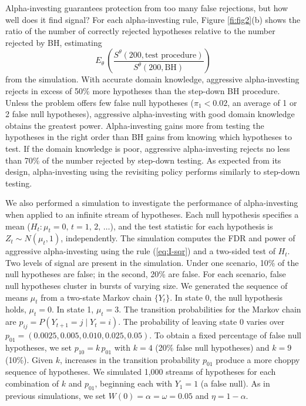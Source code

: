 \documentclass[12pt]{article}
\newcommand{\eqn}[1]{(\ref{#1})}
\newcommand{\given}{\; \big| \;}
\begin{document}
Alpha-investing guarantees protection from too many false rejections,
but how well does it find signal?  For each alpha-investing rule, Figure \ref{fi:fig2}(b)
shows the ratio of the number of correctly rejected hypotheses relative to the number rejected by BH, estimating
\begin{displaymath}
E_\theta\, \left( \frac{S^\theta(200,\mbox{test procedure})}
                       {S^\theta(200,\mbox{BH})} \right)
\end{displaymath}
from the simulation.  With accurate domain knowledge, aggressive
 alpha-investing rejects in excess of 50\% more hypotheses than the
 step-down BH procedure. Unless the problem offers few false null
 hypotheses ($\pi_1<0.02$, an average of 1 or 2 false null
 hypotheses), aggressive alpha-investing with good domain knowledge
 obtains the greatest power. Alpha-investing gains more from testing
 the hypotheses in the right order than BH gains from knowing which
 hypotheses to test.  If the domain knowledge is poor, aggressive
 alpha-investing rejects no less than 70\% of the number rejected by
 step-down testing.  As expected from its design, alpha-investing
 using the revisiting policy performs similarly to step-down testing.

We also performed a simulation to investigate the performance of
 alpha-investing when applied to an infinite stream of hypotheses.
  Each null hypothesis specifies a mean ($H_t: \mu_t = 0,\, t =
 1,\,2,\,\ldots$), and the test statistic for each hypothesis is $Z_t
 \sim N(\mu_t, 1)$, independently.  The simulation computes the FDR
 and power of aggressive alpha-investing using the rule \eqn{eq:I-sqr}
 and a two-sided test of $H_t$.  Two levels of signal are present in
 the simulation. Under one scenario, 10\% of the null hypotheses are
 false; in the second, 20\% are false.  For each scenario, false null
 hypotheses cluster in bursts of varying size.  We generated the
 sequence of means $\mu_t$ from a two-state Markov chain $\{Y_t\}$.
  In state 0, the null hypothesis holds, $\mu_t = 0$.  In state 1,
 $\mu_t = 3$.  The transition probabilities for the Markov chain are
 $p_{ij} = P(Y_{t+1} = j \given Y_{t}=i)$. The probability of leaving
 state 0 varies over $p_{01} = (0.0025, 0.005, 0.010, 0.025, 0.05)$.
  To obtain a fixed percentage of false null hypotheses, we set
 $p_{10} = k \, p_{01}$ with $k = 4$ (20\% false null hypotheses) and
 $k=9$ (10\%). Given $k$, increases in the transition probability
 $p_{01}$ produce a more choppy sequence of hypotheses. We simulated
 1,000 streams of hypotheses for each combination of $k$ and $p_{01}$,
 beginning each with $Y_1=1$ (a false null). As in previous
 simulations, we set $W(0) = \alpha = \omega = 0.05$ and $\eta=
 1-\alpha$.
\end{document}
